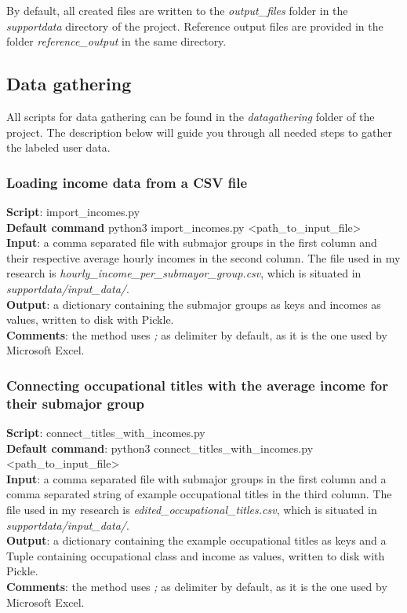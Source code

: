 \documentclass[
10pt, %
a4paper, %
oneside, %
headinclude,footinclude, %
] {book}%
\begin{document}
By default, all created files are written to the \textit{output\_files} folder in the \textit{supportdata} directory of the project. Reference output files are provided in the folder \textit{reference\_output} in the same directory.

\subsection{\textbf{Data gathering}}
All scripts for data gathering can be found in the \textit{datagathering} folder of the project. The description below will guide you through all needed steps to gather the labeled user data.

\subsubsection{Loading income data from a CSV file}
\textbf{Script}:	import\_incomes.py \\
\textbf{Default command} python3 import\_incomes.py <path\_to\_input\_file>\\
\textbf{Input}: a comma separated file with submajor groups in the first column and their respective average hourly incomes in the second column. The file used in my research is \textit{hourly\_income\_per\_submayor\_group.csv}, which is situated in \textit{supportdata/input\_data/}. \\
\textbf{Output}: a dictionary containing the submajor groups as keys and incomes as values, written to disk with Pickle. \\
\textbf{Comments}: the method uses \textit{; } as delimiter by default, as it is the one used by Microsoft Excel. 

\subsubsection{Connecting occupational titles with the average income for their submajor group}
\textbf{Script}:	connect\_titles\_with\_incomes.py \\
\textbf{Default command}: python3 connect\_titles\_with\_incomes.py <path\_to\_input\_file>\\
\textbf{Input}: a comma separated file with submajor groups in the first column and a comma separated string of example occupational titles in the third column. The file used in my research is \textit{edited\_occupational\_titles.csv}, which is situated in  \textit{supportdata/input\_data/}. \\
\textbf{Output}: a dictionary containing the example occupational titles as keys and a Tuple containing occupational class and income as values, written to disk with Pickle. \\
\textbf{Comments}: the method uses \textit{; } as delimiter by default, as it is the one used by Microsoft Excel. 
\end{document}
